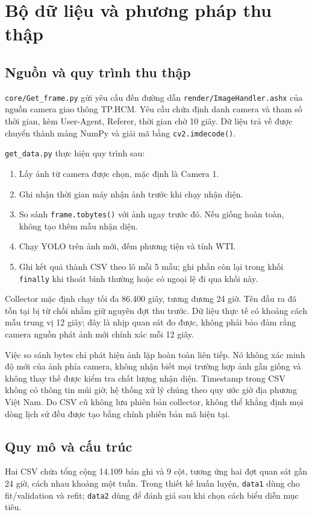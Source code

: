 \section{Bộ dữ liệu và phương pháp thu thập}
    
    \subsection{Nguồn và quy trình thu thập}
    \texttt{core/Get\_frame.py} gửi yêu cầu đến đường dẫn \texttt{render/ImageHandler.ashx} của nguồn camera giao thông TP.HCM. Yêu cầu chứa định danh camera và tham số thời gian, kèm User-Agent, Referer, thời gian chờ 10 giây. Dữ liệu trả về được chuyển thành mảng NumPy và giải mã bằng \texttt{cv2.imdecode()}.

    \texttt{get\_data.py} thực hiện quy trình sau:
    \begin{enumerate}
        \item Lấy ảnh từ camera được chọn, mặc định là Camera 1.
        \item Ghi nhận thời gian máy nhận ảnh trước khi chạy nhận diện.
        \item So sánh \texttt{frame.tobytes()} với ảnh ngay trước đó. Nếu giống hoàn toàn, không tạo thêm mẫu nhận diện.
        \item Chạy YOLO trên ảnh mới, đếm phương tiện và tính WTI.
        \item Ghi kết quả thành CSV theo lô mỗi 5 mẫu; ghi phần còn lại trong khối \texttt{finally} khi thoát bình thường hoặc có ngoại lệ đi qua khối này.
    \end{enumerate}
    Collector mặc định chạy tối đa 86.400 giây, tương đương 24 giờ. Tên đầu ra đã tồn tại bị từ chối nhằm giữ nguyên đợt thu trước. Dữ liệu thực tế có khoảng cách mẫu trung vị 12 giây; đây là nhịp quan sát đo được, không phải bảo đảm rằng camera nguồn phát ảnh mới chính xác mỗi 12 giây.

    Việc so sánh bytes chỉ phát hiện ảnh lặp hoàn toàn liên tiếp. Nó không xác minh độ mới của ảnh phía camera, không nhận biết mọi trường hợp ảnh gần giống và không thay thế được kiểm tra chất lượng nhận diện. Timestamp trong CSV không có thông tin múi giờ; hệ thống xử lý chúng theo quy ước giờ địa phương Việt Nam. Do CSV cũ không lưu phiên bản collector, không thể khẳng định mọi dòng lịch sử đều được tạo bằng chính phiên bản mã hiện tại.

    \subsection{Quy mô và cấu trúc}
    Hai CSV chứa tổng cộng 14.109 bản ghi và 9 cột, tương ứng hai đợt quan sát gần 24 giờ, cách nhau khoảng một tuần. Trong thiết kế huấn luyện, \texttt{data1} dùng cho fit/validation và refit; \texttt{data2} dùng để đánh giá sau khi chọn cách biểu diễn mục tiêu.

